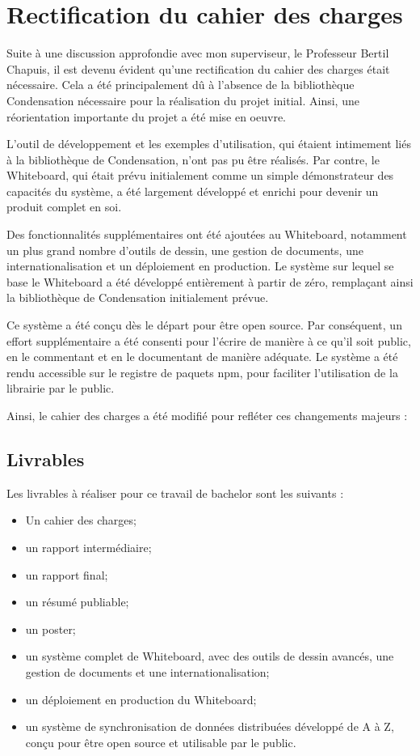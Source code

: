 \chapter*{Rectification du cahier des charges}

Suite à une discussion approfondie avec mon superviseur, le Professeur Bertil Chapuis, il est devenu évident qu'une rectification du cahier des charges était nécessaire. Cela a été principalement dû à l'absence de la bibliothèque Condensation nécessaire pour la réalisation du projet initial. Ainsi, une réorientation importante du projet a été mise en oeuvre.

L'outil de développement et les exemples d'utilisation, qui étaient intimement liés à la bibliothèque de Condensation, n'ont pas pu être réalisés. Par contre, le Whiteboard, qui était prévu initialement comme un simple démonstrateur des capacités du système, a été largement développé et enrichi pour devenir un produit complet en soi.

Des fonctionnalités supplémentaires ont été ajoutées au Whiteboard, notamment un plus grand nombre d'outils de dessin, une gestion de documents, une internationalisation et un déploiement en production. Le système sur lequel se base le Whiteboard a été développé entièrement à partir de zéro, remplaçant ainsi la bibliothèque de Condensation initialement prévue.

Ce système a été conçu dès le départ pour être open source. Par conséquent, un effort supplémentaire a été consenti pour l'écrire de manière à ce qu'il soit public, en le commentant et en le documentant de manière adéquate. Le système a été rendu accessible sur le registre de paquets \gls{npm}, pour faciliter l'utilisation de la librairie par le public.

Ainsi, le cahier des charges a été modifié pour refléter ces changements majeurs :
\section*{Livrables}

Les livrables à réaliser pour ce travail de bachelor sont les suivants :

\begin{itemize}
    \item Un cahier des charges;
    \item un rapport intermédiaire;
    \item un rapport final;
    \item un résumé publiable;
    \item un poster;
    \item un système complet de Whiteboard, avec des outils de dessin avancés, une gestion de documents et une internationalisation;
    \item un déploiement en production du Whiteboard;
    \item un système de synchronisation de données distribuées développé de A à Z, conçu pour être open source et utilisable par le public.
\end{itemize}

